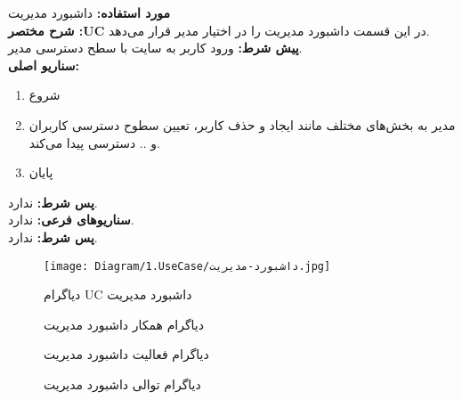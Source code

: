 \textbf{مورد استفاده:}
داشبورد مدیریت
\\
\textbf{شرح مختصر :UC}
در این قسمت داشبورد مدیریت را در اختیار مدیر قرار می‌دهد.
\\
\textbf{پيش شرط:}
ورود کاربر به سایت با سطح دسترسی مدیر.
\\
\textbf{سناريو اصلی:}
\begin{enumerate}
	\item
	شروع
	\item
	مدیر به بخش‌های مختلف مانند ایجاد و حذف کاربر، تعیین سطوح دسترسی کاربران و .. دسترسی پیدا می‌کند.
	\item
	پایان
\end{enumerate}

\noindent
\textbf{پس شرط:}
ندارد.
\\
\textbf{سناريوهای فرعی:}
ندارد.
\\
\textbf{پس شرط:}
ندارد.


\begin{figure}[H]
	\centering
	\texttt{[image: Diagram/1.UseCase/داشبورد-مدیریت.jpg]}
	\caption{دیاگرام UC داشبورد مدیریت}
	\label{fig:uc:داشبورد-مدیریت}
\end{figure}
\begin{figure}[H]
	\centering
	\caption{دیاگرام همکار داشبورد مدیریت}
	\label{fig:c:داشبورد-مدیریت}
\end{figure}
\begin{figure}[H]
	\centering
	\caption{دیاگرام فعالیت داشبورد مدیریت}
	\label{fig:a:داشبورد-مدیریت}
\end{figure}
\begin{figure}[H]
	\caption{دیاگرام توالی داشبورد مدیریت}
	\centering
	\label{fig:s:داشبورد-مدیریت}
\end{figure}
